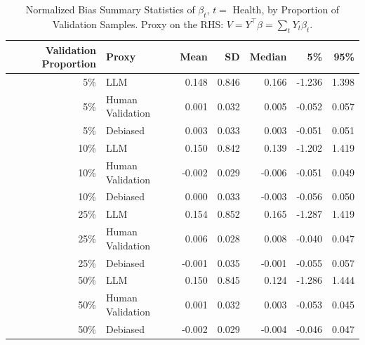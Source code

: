 \begin{table}

\caption{Normalized Bias Summary Statistics of $\beta_{t}$, $t=$ Health, by Proportion of Validation Samples.
      Proxy on the RHS: $V = Y^\top \beta = \sum_{t} Y_t \beta_t$.}
\centering
\begin{tabular}[t]{rlrrrrr}
\toprule
Validation Proportion & Proxy & Mean & SD & Median & 5\% & 95\%\\
\midrule
5\% & LLM & 0.148 & 0.846 & 0.166 & -1.236 & 1.398\\
5\% & Human Validation & 0.001 & 0.032 & 0.005 & -0.052 & 0.057\\
5\% & Debiased & 0.003 & 0.033 & 0.003 & -0.051 & 0.051\\
10\% & LLM & 0.150 & 0.842 & 0.139 & -1.202 & 1.419\\
10\% & Human Validation & -0.002 & 0.029 & -0.006 & -0.051 & 0.049\\
10\% & Debiased & 0.000 & 0.033 & -0.003 & -0.056 & 0.050\\
25\% & LLM & 0.154 & 0.852 & 0.165 & -1.287 & 1.419\\
25\% & Human Validation & 0.006 & 0.028 & 0.008 & -0.040 & 0.047\\
25\% & Debiased & -0.001 & 0.035 & -0.001 & -0.055 & 0.057\\
50\% & LLM & 0.150 & 0.845 & 0.124 & -1.286 & 1.444\\
50\% & Human Validation & 0.001 & 0.032 & 0.003 & -0.053 & 0.045\\
50\% & Debiased & -0.002 & 0.029 & -0.004 & -0.046 & 0.047\\
\bottomrule
\end{tabular}
\end{table}
